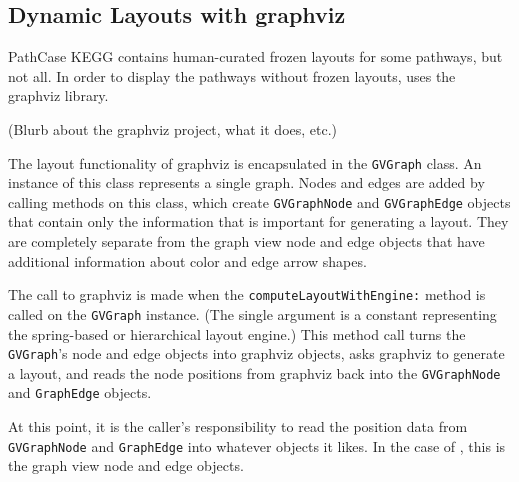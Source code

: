 \subsection{Dynamic Layouts with graphviz}
\label{sect:kegg_impl_graphviz}

PathCase KEGG contains human-curated frozen layouts for some pathways, but not
all. In order to display the pathways without frozen layouts, \keggapp
uses the graphviz library.

(Blurb about the graphviz project, what it does, etc.)

The layout functionality of graphviz is encapsulated in the \texttt{GVGraph}
class. An instance of this class represents a single graph. Nodes and edges are
added by calling methods on this class, which create \texttt{GVGraphNode} and
\texttt{GVGraphEdge} objects that contain only the information that is important
for generating a layout. They are completely separate from the graph view node
and edge objects that have additional information about color and edge arrow
shapes.

The call to graphviz is made when the \texttt{computeLayoutWithEngine:} method
is called on the \texttt{GVGraph} instance. (The single argument is a constant
representing the spring-based or hierarchical layout engine.) This method call
turns the \texttt{GVGraph}'s node and edge objects into graphviz objects, asks
graphviz to generate a layout, and reads the node positions from graphviz back
into the \texttt{GVGraphNode} and \texttt{GraphEdge} objects.

At this point, it is the caller's responsibility to read the position data from
\texttt{GVGraphNode} and \texttt{GraphEdge} into whatever objects it likes. In
the case of \keggapp, this is the graph view node and edge objects.
